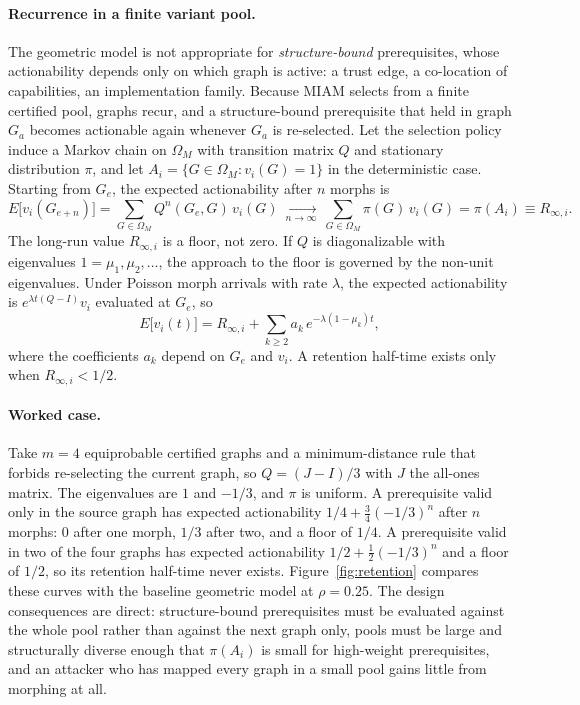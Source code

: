 \documentclass[11pt,letterpaper]{article}
\begin{document}
\paragraph{Recurrence in a finite variant pool.} The geometric model is not appropriate for \emph{structure-bound} prerequisites, whose actionability depends only on which graph is active: a trust edge, a co-location of capabilities, an implementation family. Because MIAM selects from a finite certified pool, graphs recur, and a structure-bound prerequisite that held in graph $G_a$ becomes actionable again whenever $G_a$ is re-selected. Let the selection policy induce a Markov chain on $\Omega_M$ with transition matrix $Q$ and stationary distribution $\pi$, and let $A_i=\{G\in\Omega_M: v_i(G)=1\}$ in the deterministic case. Starting from $G_e$, the expected actionability after $n$ morphs is
\begin{equation}\label{eq:markov}
E\big[v_i(G_{e+n})\big]=\sum_{G\in\Omega_M}Q^n(G_e,G)\,v_i(G)\ \xrightarrow[n\to\infty]{}\ \sum_{G\in\Omega_M}\pi(G)\,v_i(G)=\pi(A_i)\equiv R_{\infty,i}.
\end{equation}
The long-run value $R_{\infty,i}$ is a floor, not zero. If $Q$ is diagonalizable with eigenvalues $1=\mu_1,\mu_2,\dots$, the approach to the floor is governed by the non-unit eigenvalues. Under Poisson morph arrivals with rate $\lambda$, the expected actionability is $e^{\lambda t(Q-I)}v_i$ evaluated at $G_e$, so
\begin{equation}\label{eq:markovpois}
E\big[v_i(t)\big]=R_{\infty,i}+\sum_{k\ge2}a_{k}\,e^{-\lambda(1-\mu_k)t},
\end{equation}
where the coefficients $a_k$ depend on $G_e$ and $v_i$. A retention half-time exists only when $R_{\infty,i}<1/2$.

\paragraph{Worked case.} Take $m=4$ equiprobable certified graphs and a minimum-distance rule that forbids re-selecting the current graph, so $Q=(J-I)/3$ with $J$ the all-ones matrix. The eigenvalues are $1$ and $-1/3$, and $\pi$ is uniform. A prerequisite valid only in the source graph has expected actionability $1/4+\tfrac34(-1/3)^n$ after $n$ morphs: 0 after one morph, $1/3$ after two, and a floor of $1/4$. A prerequisite valid in two of the four graphs has expected actionability $1/2+\tfrac12(-1/3)^n$ and a floor of $1/2$, so its retention half-time never exists. Figure~\ref{fig:retention} compares these curves with the baseline geometric model at $\rho=0.25$. The design consequences are direct: structure-bound prerequisites must be evaluated against the whole pool rather than against the next graph only, pools must be large and structurally diverse enough that $\pi(A_i)$ is small for high-weight prerequisites, and an attacker who has mapped every graph in a small pool gains little from morphing at all.
\end{document}
